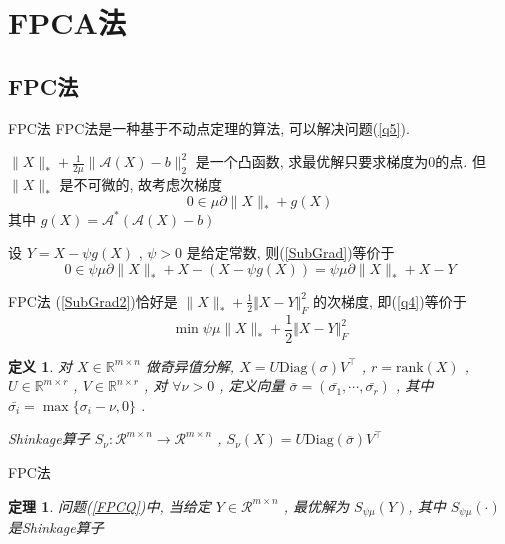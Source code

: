 \documentclass[slidestop,compress,mathserif,UTF8]{beamer}
\newtheorem{theo}{\bf \textcolor[rgb]{0.8,0,0}{定理}}[section]  %
\newtheorem{define}{\bf \textcolor[rgb]{0.8,0,0}{定义}}[section]
\numberwithin{equation}{section}                                %
\begin{document}
    \section{FPCA法}\label{section4}
        \subsection{FPC法}        
            \begin{frame}[t]{FPC法}
                FPC法是一种基于不动点定理的算法, 可以解决问题(\ref{q5}).

                $\lVert{X}\rVert_*+\frac{1}{2\mu}\lVert{\mathcal{A}(X)-b}\rVert_2^2$ 是一个凸函数, 求最优解只要求梯度为0的点. 但 $\lVert{X}\rVert_*$ 是不可微的, 故考虑次梯度
                \begin{equation}\label{SubGrad}
                    0 \in \mu \partial \lVert{X}\rVert_* + g(X)
                \end{equation}
                \small{其中 $g(X) = \mathcal{A}^*(\mathcal{A}(X) - b)$}\normalsize

                设 $Y = X - \psi g(X)$ , $\psi > 0$ 是给定常数, 则(\ref{SubGrad})等价于
                \begin{equation}\label{SubGrad2}
                    0 \in \psi \mu \partial \lVert{X}\rVert_* + X - (X - \psi g(X)) = \psi \mu \partial \lVert{X}\rVert_* + X -Y
                \end{equation}
            \end{frame}
            \begin{frame}[t]{FPC法}
                (\ref{SubGrad2})恰好是 $\lVert{X}\rVert_* + \frac{1}{2} \Vert{X - Y}\Vert^2_F$ 的次梯度, 即(\ref{q4})等价于 
                \begin{equation}\label{FPCQ}
                    \min \psi \mu \lVert{X}\rVert_* + \frac{1}{2} \Vert{X - Y}\Vert^2_F
                \end{equation}

                \begin{define}
                    对 $X \in \mathbb{R}^{m \times n}$ 做奇异值分解, $X = U \text{Diag}(\sigma) V ^\top$ , $r = \text{rank}(X)$ , $U \in \mathbb{R}^{m \times r}$ , $V \in \mathbb{R}^{n \times r}$ , 对 $\forall \nu > 0$ , 定义向量 $\bar{\sigma} = (\bar{\sigma_1}, \cdots, \bar{\sigma_r})$ , 其中$\bar{\sigma_i} = \max \{\sigma_i - \nu, 0\}$ .
                    
                    Shinkage算子 $S_\nu: \mathcal{R}^{m \times n} \rightarrow \mathcal{R}^{m \times n}$ , $S_\nu(X) = U \text{Diag}(\bar{\sigma}) V ^\top$
                \end{define}
            \end{frame}
            \begin{frame}[t]{FPC法}
                \begin{theo}
                    问题(\ref{FPCQ})中, 当给定 $Y \in \mathcal{R}^{m \times n}$ , 最优解为 $S_{\psi \mu}(Y)$, 其中 $S_{\psi \mu}(\cdot)$ 是Shinkage算子
                \end{theo}
            \end{frame}
\end{document}
